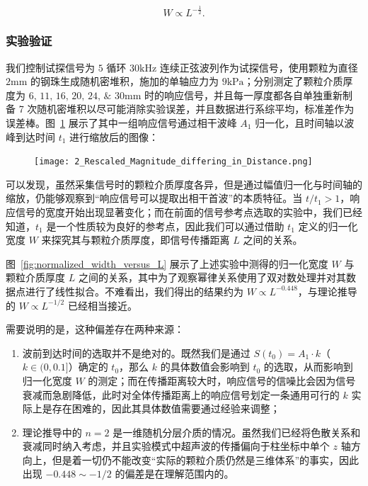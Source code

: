 \begin{equation}
  W\propto L^{-\frac{1}{2}}.
\end{equation}

\subsubsection{实验验证}

我们控制试探信号为 $5$ 循环 $30\unit{\kilo\Hz}$ 连续正弦波列作为试探信号，使用颗粒为直径 $2\unit{\milli\meter}$ 的钢珠生成随机密堆积，施加的单轴应力为 $9\unit{\kilo\Pa}$；分别测定了颗粒介质厚度为 $\numlist{6;11;16;20;24;30}\unit{\milli\metre}$ 时的响应信号，并且每一厚度都各自单独重新制备 7 次随机密堆积以尽可能消除实验误差，并且数据进行系综平均，标准差作为误差棒。图~\ref{fig:reference_point} 展示了其中一组响应信号通过相干波峰 $A_{1}$ 归一化，且时间轴以波峰到达时间 $t_{1}$ 进行缩放后的图像：

\begin{figure}[!htp]
  \centering
  \texttt{[image: 2\_Rescaled\_Magnitude\_differing\_in\_Distance.png]}
  \label{fig:reference_point}
\end{figure}

可以发现，虽然采集信号时的颗粒介质厚度各异，但是通过幅值归一化与时间轴的缩放，仍能够观察到“响应信号可以提取出相干首波”的本质特征。当 $t/t_{1} > 1$，响应信号的宽度开始出现显著变化；而在前面的信号参考点选取的实验中，我们已经知道，$t_{1}$ 是一个性质较为良好的参考点，因此我们可以通过借助 $t_{1}$ 定义的归一化宽度 $W$ 来探究其与颗粒介质厚度，即信号传播距离 $L$ 之间的关系。

图~\ref{fig:normalized_width_versus_L} 展示了上述实验中测得的归一化宽度 $W$ 与颗粒介质厚度 $L$ 之间的关系，其中为了观察幂律关系使用了双对数处理并对其数据点进行了线性拟合。不难看出，我们得出的结果约为 $W\propto L^{-0.448}$，与理论推导的 $W\propto L^{-1/2}$ 已经相当接近。

需要说明的是，这种偏差存在两种来源：

\begin{enumerate}
  \item 波前到达时间的选取并不是绝对的。既然我们是通过 $S(t_{0}) = A_{1}\cdot k$（$k\in(0,0.1]$）确定的 $t_{0}$，那么 $k$ 的具体数值会影响到 $t_{0}$ 的选取，从而影响到归一化宽度 $W$ 的测定；而在传播距离较大时，响应信号的信噪比会因为信号衰减而急剧降低，此时对全体传播距离上的响应信号划定一条通用可行的 $k$ 实际上是存在困难的，因此其具体数值需要通过经验来调整；
  \item 理论推导中的 $n=2$ 是一维随机分层介质的情况。虽然我们已经将色散关系和衰减同时纳入考虑，并且实验模式中超声波的传播偏向于柱坐标中单个 $z$ 轴方向上，但是着一切仍不能改变“实际的颗粒介质仍然是三维体系”的事实，因此出现 $-0.448\sim-1/2$ 的偏差是在理解范围内的。
\end{enumerate}

